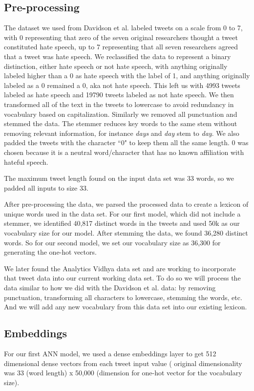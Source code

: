 \documentclass[conference]{sig-alternate-05-2015}
\begin{document}
\subsection{Pre-processing}
The dataset we used from Davidson et al. labeled tweets on a scale from 0 to 7, with 0 representing that zero of the seven original researchers thought a tweet constituted hate speech, up to 7 representing that all seven researchers agreed that a tweet was hate speech. We reclassified the data to represent a binary distinction, either hate speech or not hate speech, with anything originally labeled higher than a 0 as hate speech with the label of 1, and anything originally labeled as a 0 remained a 0, aka not hate speech. This left us with 4993 tweets labeled as hate speech and 19790 tweets labeled as not hate speech.
We then transformed all of the text in the tweets to lowercase to avoid redundancy in vocabulary based on capitalization. 
Similarly we removed all punctuation and stemmed the data. The stemmer reduces key words to the same stem without removing relevant information, for instance \textit{days} and \textit{day} stem to \textit{day}.
We also padded the tweets with the character ``0" to keep them all the same length. 0 was chosen because it is a neutral word/character that has no known affiliation with hateful speech.

The maximum tweet length found on the input data set was 33 words, so we padded all inputs to size 33.

After pre-processing the data, we parsed the processed data to create a lexicon of unique words used in the data set. For our first model, which did not include a stemmer, we identified 40,817 distinct words in the tweets and used 50k as our vocabulary size for our model. After stemming the data, we found 36,280 distinct words. So for our second model, we set our vocabulary size as 36,300 for generating the one-hot vectors.

We later found the Analytics Vidhya data set and are working to incorporate that tweet data into our current working data set. To do so we will process the data similar to how we did with the Davidson et al. data: by removing punctuation, transforming all characters to lowercase, stemming the words, etc. And we will add any new vocabulary from this data set into our existing lexicon.

\subsection{Embeddings}
For our first ANN model, we used a dense embeddings layer to get 512 dimensional dense vectors from each tweet input value ( original dimensionality was 33 (word length) x 50,000 (dimension for one-hot vector for the vocabulary size).
\end{document}
